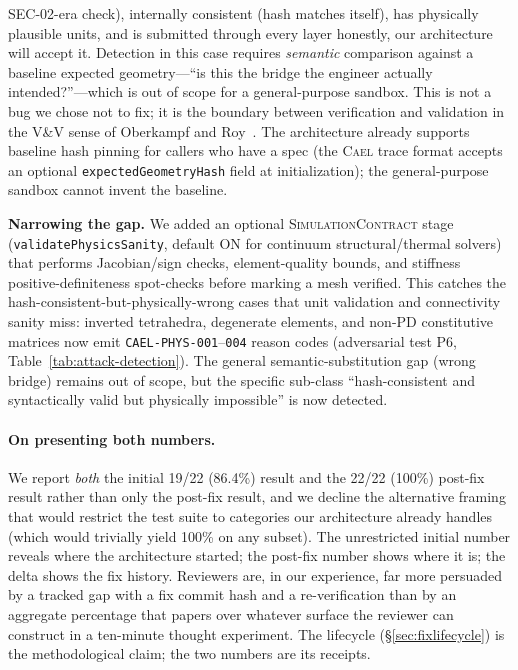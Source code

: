 \documentclass[letterpaper,twocolumn,10pt]{article}
\newcommand{\cael}{\textsc{Cael}}
\newcommand{\simcontract}{\textsc{SimulationContract}}
\begin{document}
\begin{itemize}[leftmargin=*,topsep=2pt,itemsep=2pt]
    SEC-02-era check), internally consistent (hash matches itself),
    has physically plausible units, and is submitted through every
    layer honestly, our architecture will accept it. Detection in
    this case requires \emph{semantic} comparison against a baseline
    expected geometry---``is this the bridge the engineer actually
    intended?''---which is out of scope for a general-purpose
    sandbox. This is not a bug we chose not to fix; it is the
    boundary between verification and validation in the V\&V sense
    of Oberkampf and Roy~\cite{oberkampf2010verification}. The
    architecture already supports baseline hash pinning for callers
    who have a spec (the \cael{} trace format accepts an optional
    \texttt{expectedGeometryHash} field at initialization); the
    general-purpose sandbox cannot invent the baseline.

    \textbf{Narrowing the gap.} We added an optional \simcontract{}
    stage (\texttt{validatePhysicsSanity}, default ON for continuum
    structural/thermal solvers) that performs Jacobian/sign checks,
    element-quality bounds, and stiffness positive-definiteness
    spot-checks before marking a mesh verified. This catches the
    hash-consistent-but-physically-wrong cases that unit validation
    and connectivity sanity miss: inverted tetrahedra, degenerate
    elements, and non-PD constitutive matrices now emit
    \texttt{CAEL-PHYS-001}--\texttt{004} reason codes (adversarial
    test P6, Table~\ref{tab:attack-detection}). The general
    semantic-substitution gap (wrong bridge) remains out of scope,
    but the specific sub-class ``hash-consistent and syntactically
    valid but physically impossible'' is now detected.
\end{itemize}

\paragraph{On presenting both numbers.} We report \emph{both} the
initial 19/22 (86.4\%) result and the 22/22 (100\%) post-fix result
rather than only the post-fix result, and we decline the alternative
framing that would restrict the test suite to categories our
architecture already handles (which would trivially yield 100\% on
any subset). The unrestricted initial number reveals where the
architecture started; the post-fix number shows where it is; the
delta shows the fix history. Reviewers are, in our experience, far
more persuaded by a tracked gap with a fix commit hash and a
re-verification than by an aggregate percentage that papers over
whatever surface the reviewer can construct in a ten-minute thought
experiment. The lifecycle (\S\ref{sec:fixlifecycle}) is the
methodological claim; the two numbers are its receipts.
\end{document}
